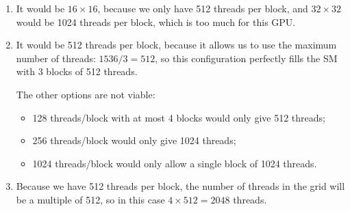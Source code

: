 \documentclass{report}
\begin{document}
\begin{enumerate}
    \item It would be $16\times16$, because we only have 512 threads per block, and $32\times32$ would be 1024 threads per block, which is too much for this GPU.

    \item It would be 512 threads per block, because it allows us to use the maximum number of threads: $1536 / 3 = 512$, so this configuration perfectly fills the SM with 3 blocks of 512 threads.

    The other options are not viable:
    \begin{itemize}
        \item 128 threads/block with at most 4 blocks would only give 512 threads;
        \item 256 threads/block would only give 1024 threads;
        \item 1024 threads/block would only allow a single block of 1024 threads.
    \end{itemize}

    \item Because we have 512 threads per block, the number of threads in the grid will be a multiple of 512, so in this case $4 \times 512 = 2048$ threads.
\end{enumerate}
\end{document}
